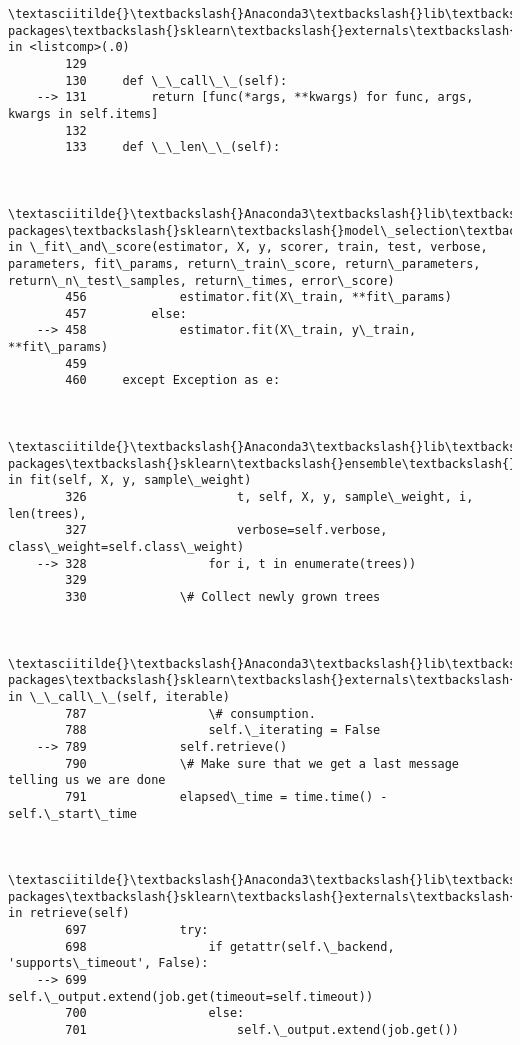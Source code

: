 \documentclass[11pt]{article}
\begin{document}
\begin{Verbatim}[commandchars=\\\{\}]
        \textasciitilde{}\textbackslash{}Anaconda3\textbackslash{}lib\textbackslash{}site-packages\textbackslash{}sklearn\textbackslash{}externals\textbackslash{}joblib\textbackslash{}parallel.py in <listcomp>(.0)
        129 
        130     def \_\_call\_\_(self):
    --> 131         return [func(*args, **kwargs) for func, args, kwargs in self.items]
        132 
        133     def \_\_len\_\_(self):
    

        \textasciitilde{}\textbackslash{}Anaconda3\textbackslash{}lib\textbackslash{}site-packages\textbackslash{}sklearn\textbackslash{}model\_selection\textbackslash{}\_validation.py in \_fit\_and\_score(estimator, X, y, scorer, train, test, verbose, parameters, fit\_params, return\_train\_score, return\_parameters, return\_n\_test\_samples, return\_times, error\_score)
        456             estimator.fit(X\_train, **fit\_params)
        457         else:
    --> 458             estimator.fit(X\_train, y\_train, **fit\_params)
        459 
        460     except Exception as e:
    

        \textasciitilde{}\textbackslash{}Anaconda3\textbackslash{}lib\textbackslash{}site-packages\textbackslash{}sklearn\textbackslash{}ensemble\textbackslash{}forest.py in fit(self, X, y, sample\_weight)
        326                     t, self, X, y, sample\_weight, i, len(trees),
        327                     verbose=self.verbose, class\_weight=self.class\_weight)
    --> 328                 for i, t in enumerate(trees))
        329 
        330             \# Collect newly grown trees
    

        \textasciitilde{}\textbackslash{}Anaconda3\textbackslash{}lib\textbackslash{}site-packages\textbackslash{}sklearn\textbackslash{}externals\textbackslash{}joblib\textbackslash{}parallel.py in \_\_call\_\_(self, iterable)
        787                 \# consumption.
        788                 self.\_iterating = False
    --> 789             self.retrieve()
        790             \# Make sure that we get a last message telling us we are done
        791             elapsed\_time = time.time() - self.\_start\_time
    

        \textasciitilde{}\textbackslash{}Anaconda3\textbackslash{}lib\textbackslash{}site-packages\textbackslash{}sklearn\textbackslash{}externals\textbackslash{}joblib\textbackslash{}parallel.py in retrieve(self)
        697             try:
        698                 if getattr(self.\_backend, 'supports\_timeout', False):
    --> 699                     self.\_output.extend(job.get(timeout=self.timeout))
        700                 else:
        701                     self.\_output.extend(job.get())
    


\end{Verbatim}
\end{document}
